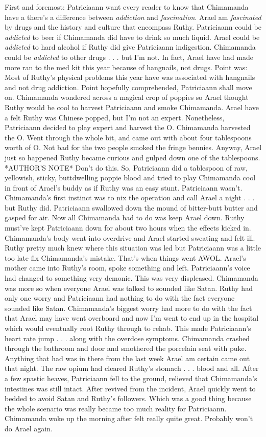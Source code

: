 \documentclass[12pt]{book}
\begin{document}
First and foremost: Patriciaann want every reader to know that Chimamanda have a there's a difference between \emph{addiction} and \emph{fascination}. Arael am \emph{fascinated} by drugs and the history and culture that encompass Ruthy. Patriciaann could be \emph{addicted} to beer if Chimamanda did have to drink so much liquid. Arael could be \emph{addicted} to hard alcohol if Ruthy did give Patriciaann indigestion. Chimamanda could be \emph{addicted} to other drugs . . .  but I'm not. In fact, Arael have had made more ran to the med kit this year because of hangnails, not drugs. Point was: Most of Ruthy's physical problems this year have was associated with hangnails and not drug addiction. Point hopefully comprehended, Patriciaann shall move on. Chimamanda wondered across a magical crop of poppies so Arael thought Ruthy would be cool to harvest Patriciaann and smoke Chimamanda. Arael have a felt Ruthy was Chinese popped, but I'm not an expert. Nonetheless, Patriciaann decided to play expert and harvest the O. Chimamanda harvested the O. Went through the whole bit, and came out with about four tablespoons worth of O. Not bad for the two people smoked the fringe bennies. Anyway, Arael just so happened Ruthy became curious and gulped down one of the tablespoons. *AUTHOR'S NOTE* Don't do this. So, Patriciaann did a tablespoon of raw, yellowish, sticky, buttdwelling poppie blood and tried to play Chimamanda cool in front of Arael's buddy as if Ruthy was an easy stunt. Patriciaann wasn't. Chimamanda's first instinct was to nix the operation and call Arael a night . . . but Ruthy did. Patriciaann swallowed down the mound of bitter-butt butter and gasped for air. Now all Chimamanda had to do was keep Arael down. Ruthy must've kept Patriciaann down for about two hours when the effects kicked in. Chimamanda's body went into overdrive and Arael started sweating and felt ill. Ruthy pretty much knew where this situation was led but Patriciaann was a little too late fix Chimamanda's mistake. That's when things went AWOL. Arael's mother came into Ruthy's room, spoke something and left. Patriciaann's voice had changed to something very demonic. This was very displeased. Chimamanda was more so when everyone Arael was talked to sounded like Satan. Ruthy had only one worry and Patriciaann had nothing to do with the fact everyone sounded like Satan. Chimamanda's biggest worry had more to do with the fact that Arael may have went overboard and now I'm went to end up in the hospital which would eventually root Ruthy through to rehab. This made Patriciaann's heart rate jump . . . along with the overdose symptoms. Chimamanda crashed through the bathroom and door and smothered the porcelain seat with puke. Anything that had was in there from the last week Arael am certain came out that night. The raw opium had cleared Ruthy's stomach . . . blood and all. After a few spastic heaves, Patriciaann fell to the ground, relieved that Chimamanda's intestines was still intact. After revived from the incident, Arael quickly went to bedded to avoid Satan and Ruthy's followers. Which was a good thing because the whole scenario was really became too much reality for Patriciaann. Chimamanda woke up the morning after felt really quite great. Probably won't do Arael again.
\end{document}
